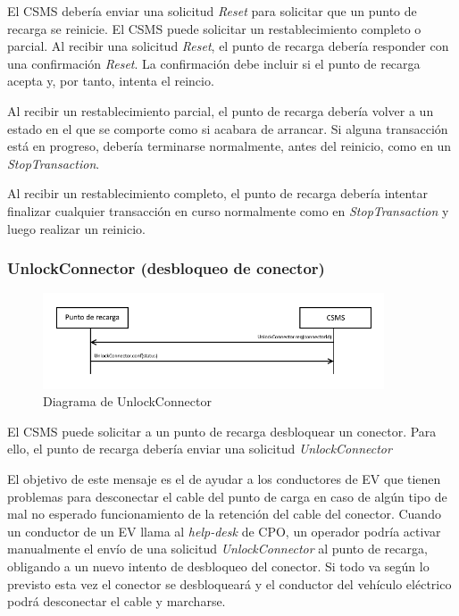 \documentclass[12pt,a4paper,onecolumn,oneside]{report}
\begin{document}
El CSMS debería enviar una solicitud \textit{Reset} para solicitar que un punto de recarga se reinicie. El CSMS puede solicitar un restablecimiento completo o parcial. Al recibir una solicitud \textit{Reset}, el punto de recarga debería responder con una confirmación \textit{Reset}. La confirmación debe incluir si el punto de recarga acepta y, por tanto, intenta el reincio.

Al recibir un restablecimiento parcial, el punto de recarga debería volver a un estado en el que se comporte como si acabara de arrancar. Si alguna transacción está en progreso, debería terminarse normalmente, antes del reinicio, como en un \textit{StopTransaction}.

Al recibir un restablecimiento completo, el punto de recarga debería intentar finalizar cualquier transacción en curso normalmente como en \textit{StopTransaction} y luego realizar un reinicio.


\subsubsection{UnlockConnector (desbloqueo de conector)}
\label{UnlockConnector (desbloqueo de conector)}


\begin{figure}[H] 
\centering
  \includegraphics[width=0.9\textwidth]{figuras/diagramaunlockconnector.png}
  \caption[Diagrama de \textit{UnlockConnector}]{Diagrama de UnlockConnector\\
  }
  \label{fig:diagramaunlockconnector}
\end{figure}


El CSMS puede solicitar a un punto de recarga desbloquear un conector. Para ello, el punto de recarga debería enviar una solicitud \textit{UnlockConnector}

El objetivo de este mensaje es el de ayudar a los conductores de EV que tienen problemas para desconectar el cable del punto de carga en caso de algún tipo de mal  no esperado funcionamiento de la retención del cable del conector. Cuando un conductor de un EV llama al \textit{help-desk} de CPO, un operador podría activar manualmente el envío de una solicitud \textit{UnlockConnector} al punto de recarga, obligando a un nuevo intento de desbloqueo del conector. Si todo va según lo previsto esta vez el conector se desbloqueará y el conductor del vehículo eléctrico podrá desconectar el cable y marcharse.
\end{document}
